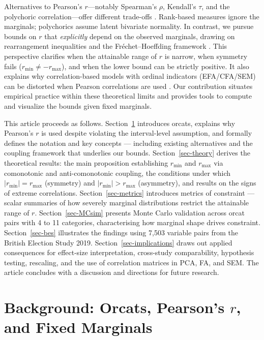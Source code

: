 \documentclass[
  12pt,
]{article}
\theoremstyle{plain}
\theoremstyle{definition}
\theoremstyle{remark}
\begin{document}
Alternatives to Pearson's \(r\)---notably Spearman's \(\rho\), Kendall's
\(\tau\), and the polychoric correlation---offer different trade-offs
\autocite{spea04-proof,kend38-new,olss79-maximum}. Rank-based measures
ignore the marginals; polychorics assume latent bivariate normality. In
contrast, we pursue bounds on \(r\) that \emph{explicitly} depend on the
observed marginals, drawing on rearrangement inequalities and the
Fréchet--Hoeffding framework
\autocite{frec51-tableaux,hoef40-masstabinvariante,rusc81-sharpness}.
This perspective clarifies when the attainable range of \(r\) is narrow,
when symmetry fails (\(r_{\min}\neq -r_{\max}\)), and when the lower
bound can be strictly positive. It also explains why correlation-based
models with ordinal indicators (EFA/CFA/SEM) can be distorted when
Pearson correlations are used \autocite{flor04-empirical,gree97-effect}.
Our contribution situates empirical practice within these theoretical
limits and provides tools to compute and visualize the bounds given
fixed marginals.

This article proceeds as follows. Section~\ref{sec-background}
introduces orcats, explains why Pearson's \(r\) is used despite
violating the interval-level assumption, and formally defines the
notation and key concepts --- including existing alternatives and the
coupling framework that underlies our bounds. Section~\ref{sec-theory}
derives the theoretical results: the main proposition establishing
\(r_{\min}\) and \(r_{\max}\) via comonotonic and anti-comonotonic
coupling, the conditions under which \(|r_{\min}| = r_{\max}\)
(symmetry) and \(|r_{\min}| > r_{\max}\) (asymmetry), and results on the
signs of extreme correlations. Section~\ref{sec-metrics} introduces
metrics of constraint --- scalar summaries of how severely marginal
distributions restrict the attainable range of \(r\).
Section~\ref{sec-MCsim} presents Monte Carlo validation across orcat
pairs with 4 to 11 categories, characterising how marginal shape drives
constraint. Section~\ref{sec-bes} illustrates the findings using 7,503
variable pairs from the British Election Study 2019.
Section~\ref{sec-implications} draws out applied consequences for
effect-size interpretation, cross-study comparability, hypothesis
testing, rescaling, and the use of correlation matrices in PCA, FA, and
SEM. The article concludes with a discussion and directions for future
research.

\section{\texorpdfstring{Background: Orcats, Pearson's \(r\), and Fixed
Marginals}{Background: Orcats, Pearson's r, and Fixed Marginals}}\label{sec-background}
\end{document}

